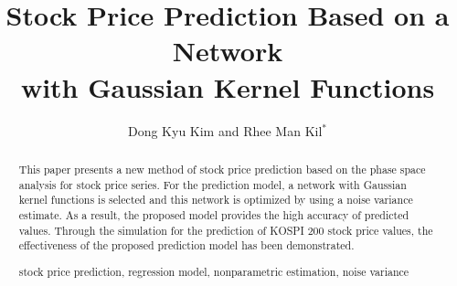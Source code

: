 \documentclass[runningheads,a4paper]{llncs}
\newcommand{\keywords}[1]{\par\addvspace\baselineskip
\noindent\keywordname\enspace\ignorespaces#1}
\begin{document}
\mainmatter  %

\title{Stock Price Prediction Based on a Network\protect\\
       with Gaussian Kernel Functions}


%
%
\author{Dong Kyu Kim and Rhee Man Kil$^*$}
%


%
%


\maketitle

\begin{abstract}
This paper presents a new method of stock price prediction based on the phase space analysis
for stock price series. For the prediction model, a network with Gaussian kernel functions is selected
and this network is optimized by using a noise variance estimate.
As a result, the proposed model provides the high accuracy of predicted values.
Through the simulation for the prediction of KOSPI 200 stock price values, the effectiveness
of the proposed prediction model has been demonstrated.
\keywords{stock price prediction, regression model, nonparametric estimation, noise variance}
\end{abstract}
\end{document}
